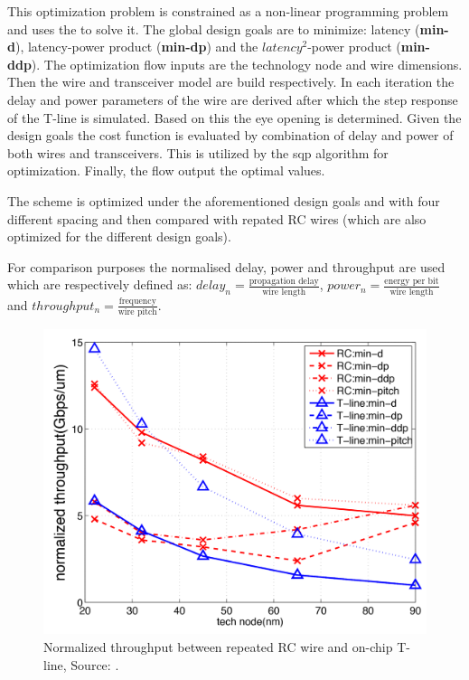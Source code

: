This optimization problem is constrained as a non-linear programming problem and uses the  to solve it.
The global design goals are to minimize: latency (\textbf{min-d}), latency-power product (\textbf{min-dp}) and the $latency^{2}$-power product (\textbf{min-ddp}).
The optimization flow inputs are the technology node and wire dimensions.
Then the wire and transceiver model are build respectively.
In each iteration the delay and power parameters of the wire are derived after which the step response of the T-line is simulated.
Based on this the eye opening is determined.
Given the design goals the cost function is evaluated by combination of delay and power of both wires and transceivers.
This is utilized by the \ac{sqp} algorithm for optimization.
Finally, the flow output the optimal values.

The scheme is optimized under the aforementioned design goals and with four different spacing and then compared with repated RC wires (which are also optimized for the different design goals).

For comparison purposes the normalised delay, power and throughput are used which are respectively defined as: $delay_{n} = \frac{\text{propagation delay}}{\text{wire length}}$, $power_{n} = \frac{\text{energy per bit}}{\text{wire length}}$ and $throughput_{n} = \frac{\text{frequency}}{\text{wire pitch}}$.

\begin{figure}	\centering
	
	\includegraphics[width=0.95\linewidth]{Figures/Rep3NormThrough.png}
	\caption{Normalized throughput between repeated RC wire and on-chip T-line, Source: \cite{zhang2009high}.} 
    \label{fig:rep3:normthrough}
\end{figure}

